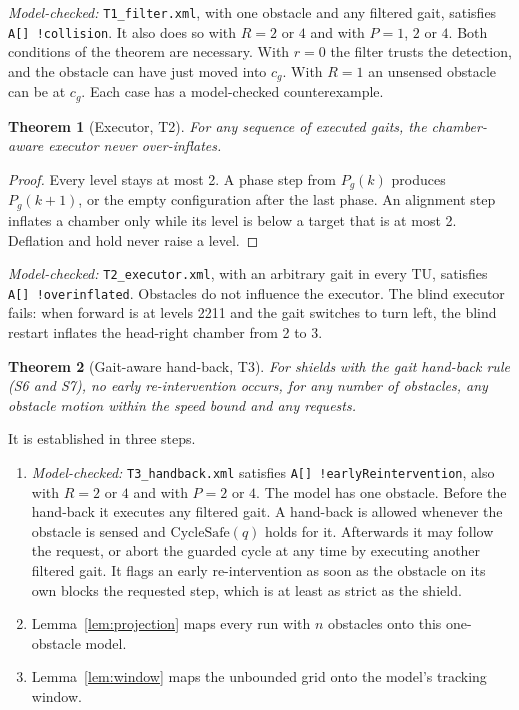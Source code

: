 \documentclass[11pt,a4paper]{article}
\newtheorem{theorem}{Theorem}
\theoremstyle{definition}
\newcommand{\tu}{TU}
\newcommand{\CycleSafe}{\mathrm{CycleSafe}}
\begin{document}
\emph{Model-checked:} \texttt{T1\_filter.xml}, with one obstacle and any filtered gait, satisfies \texttt{A[] !collision}. It also does so with $R=2$ or $4$ and with $P=1$, $2$ or $4$. Both conditions of the theorem are necessary. With $r=0$ the filter trusts the detection, and the obstacle can have just moved into $c_g$. With $R=1$ an unsensed obstacle can be at $c_g$. Each case has a model-checked counterexample.

\begin{theorem}[Executor, T2]\label{thm:t2}
For any sequence of executed gaits, the chamber-aware executor never over-inflates.
\end{theorem}

\begin{proof}
Every level stays at most 2. A phase step from $P_g(k)$ produces $P_g(k+1)$, or the empty configuration after the last phase. An alignment step inflates a chamber only while its level is below a target that is at most 2. Deflation and hold never raise a level.
\end{proof}

\emph{Model-checked:} \texttt{T2\_executor.xml}, with an arbitrary gait in every \tu, satisfies \texttt{A[] !overinflated}. Obstacles do not influence the executor. The blind executor fails: when forward is at levels 2211 and the gait switches to turn left, the blind restart inflates the head-right chamber from 2 to 3.

\begin{theorem}[Gait-aware hand-back, T3]\label{thm:t3}
For shields with the gait hand-back rule (S6 and S7), no early re-intervention occurs, for any number of obstacles, any obstacle motion within the speed bound and any requests.
\end{theorem}

It is established in three steps.
\begin{enumerate}
  \item \emph{Model-checked:} \texttt{T3\_handback.xml} satisfies \texttt{A[] !earlyReintervention}, also with $R=2$ or $4$ and with $P=2$ or $4$. The model has one obstacle. Before the hand-back it executes any filtered gait. A hand-back is allowed whenever the obstacle is sensed and $\CycleSafe(q)$ holds for it. Afterwards it may follow the request, or abort the guarded cycle at any time by executing another filtered gait. It flags an early re-intervention as soon as the obstacle on its own blocks the requested step, which is at least as strict as the shield.
  \item Lemma~\ref{lem:projection} maps every run with $n$ obstacles onto this one-obstacle model.
  \item Lemma~\ref{lem:window} maps the unbounded grid onto the model's tracking window.
\end{enumerate}
\end{document}
